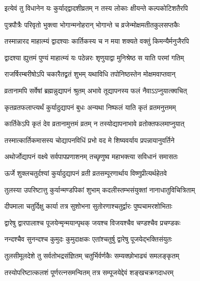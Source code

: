\twolineshloka
{इत्येवं तु विधानेन यः कुर्याद्द्वादशीव्रतम्}
{न तस्य लोकाः क्षीयन्ते कल्पकोटिशतैरपि} %

\twolineshloka
{पुत्रपौत्रैः परिवृतो भुक्त्वा भोगान्मनोहरान्}
{भोगान्ते च व्रजेन्मोक्षमतीतकुलसप्तकैः} %

\twolineshloka
{तस्मान्नारद माहात्म्यं द्वादश्याः कार्तिकस्य च}
{न मया शक्यते वक्तुं किमन्यैर्मनुजैरपि} %

\twolineshloka
{द्वादश्या ह्युत्तमं पुण्यं माहात्म्यं यः पठेन्नरः}
{शृणुयाद्वा मुनिश्रेष्ठ स याति परमां गतिम्} %

\twolineshloka
{राजर्षिरम्बरीषोऽपि चकारैतद्व्रतं शुभम्}
{यथाविधि तपोनिष्ठस्तेन मोक्षमवाप्तवान्} %





\twolineshloka
{व्रतानामपि सर्वेषां ब्रह्मन्नुद्यापनं श्रुतम्}
{अभावे तूद्यापनस्य फलं नैवाऽऽप्नुयात्क्वचित्} %

\twolineshloka
{कृतव्रतफलाप्त्यर्थं कुर्यादुद्यापनं बुधः}
{अन्यथा निष्फलं याति कृतं व्रतमनुत्तमम्} %

\twolineshloka
{कार्तिकेऽपि कृतं देव व्रतानामुत्तमं व्रतम्}
{न तस्योद्यापनाभावे व्रतोक्तफलमाप्नुयात्} %

\twolineshloka
{तस्मात्कार्तिकमासस्य चोद्यापनविधिं प्रभो}
{वद मे शिष्यवर्याय प्रपन्नायानुवर्तिने} %


\twolineshloka
{अथोर्जोद्यापनं वक्ष्ये सर्वपापप्रणाशनम्}
{तच्छृणुष्व महाभक्त्या सविधानं समासतः} %

\twolineshloka
{ऊर्जे शुक्लचतुर्दश्यां कुर्यादुद्यापनं व्रती}
{व्रतसम्पूरणार्थाय विष्णुप्रीत्यर्थहेतवे} %

\twolineshloka
{तुलस्या उपरिष्टात्तु कुर्यान्मण्डपिकां शुभाम्}
{कदलीस्तम्भसंयुक्तां नानाधातुविचित्रिताम्} %

\twolineshloka
{दीपमाला चतुर्दिक्षु कार्या तत्र सुशोभना}
{सुतोरणाश्चतुर्द्वारः पुष्पचामरशोभिताः} %

\twolineshloka
{द्वारेषु द्वारपालाश्च पूजयेन्मृन्मयान्पृथक्}
{जयश्च विजयश्चैव चण्डश्चैव प्रचण्डकः} %

\twolineshloka
{नन्दश्चैव सुनन्दश्च कुमुदः कुमुदाक्षकः}
{एतांश्चतुर्षु द्वारेषु पूजयेद्भक्तिसंयुतः} %

\twolineshloka
{तुलसीमूलदेशे तु सर्वतोभद्रसंज्ञितम्}
{चतुर्भिर्वर्णकैः सम्यक्छोभाढ्यं समलङ्कृतम्} %

\twolineshloka
{तस्योपरिष्टात्कलशं पूर्णरत्नसमन्वितम्}
{तत्र सम्पूजयेद्देवं शङ्खचक्रगदाधरम्} %

